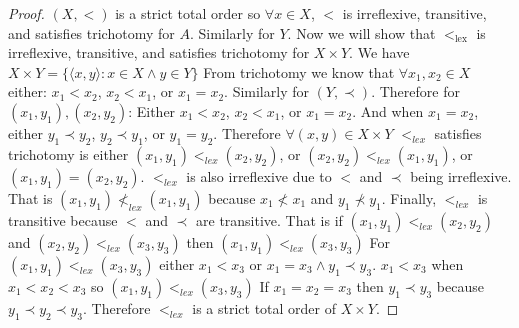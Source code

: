 \documentclass[11pt]{amsart}
\begin{document}
\begin{enumerate}
\begin{proof}
 $(X,<)$ is a strict total order so $\forall x \in X$, $<$ is irreflexive, transitive, and satisfies trichotomy for $A$.
 Similarly for $Y$.
 Now we will show that $<_{\text{lex}}$ is irreflexive, transitive, and satisfies trichotomy for $X \times Y$.
 We have $X \times Y = \{\langle x, y \rangle : x \in X \wedge y \in Y\}$
 From trichotomy we know that $\forall x_1,x_2 \in X$ either: $x_1 < x_2$, $x_2 < x_1$, or $x_1 = x_2$.
 Similarly for $(Y,\prec)$.
 Therefore for $(x_1,y_1), (x_2,y_2)$:
 Either $x_1 < x_2$, $x_2 < x_1$, or $x_1 = x_2$.
 And when $x_1 = x_2$, either $y_1 \prec y_2$, $y_2 \prec y_1$, or $y_1 = y_2$.
 Therefore $\forall (x,y) \in X \times Y$ $<_{lex}$ satisfies trichotomy is either $(x_1,y_1) <_{lex} (x_2, y_2)$, or $(x_2,y_2) <_{lex} (x_1,y_1)$, or $(x_1,y_1) = (x_2,y_2)$.
 $<_{lex}$ is also irreflexive due to $<$ and $\prec$ being irreflexive.
 That is $(x_1,y_1) \nless_{lex} (x_1,y_1)$ because $x_1 \nless x_1$ and $y_1 \nprec y_1$.
 Finally, $<_{lex}$ is transitive because $<$ and $\prec$ are transitive.
 That is if $(x_1,y_1) <_{lex} (x_2,y_2)$ and $(x_2,y_2) <_{lex} (x_3,y_3)$ then $(x_1,y_1) <_{lex} (x_3,y_3)$
 For $(x_1,y_1) <_{lex} (x_3,y_3)$ either $x_1 < x_3$ or $x_1 = x_3 \wedge y_1 \prec y_3$.
 $x_1 < x_3$ when $x_1 < x_2 < x_3$ so $(x_1,y_1) <_{lex} (x_3,y_3)$
 If $x_1 = x_2 = x_3$ then $y_1 \prec y_3$  because $y_1 \prec y_2 \prec y_3$.
 Therefore $<_{lex}$ is a strict total order of $X \times Y$.


\end{proof}
\end{enumerate}
\end{document}
